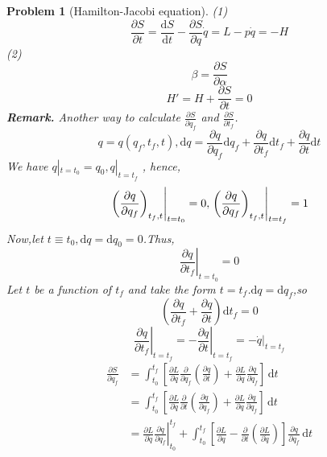 \documentclass{article}
\theoremstyle{t}
\newtheorem{problem}{Problem}
\newcommand{\dd}{\mathrm{d}}
\newcommand{\pa}{\partial}
\begin{document}
\begin{problem}[Hamilton-Jacobi equation]
    (1) \begin{equation}
        \frac{\pa S}{\pa t}=\frac{\dd S}{\dd t}-\frac{\pa S}{\pa q}\dot{q}=L-p\dot{q}=-H
    \end{equation}
    (2) \begin{equation}
        \beta=\frac{\pa S}{\pa \alpha}
    \end{equation}
    \begin{equation}
        H'=H+\frac{\pa S}{\pa t}=0
    \end{equation}
    \textbf{Remark.} Another way to calculate $\frac{\pa S}{\pa q_f}$ and $\frac{\pa S}{\pa t_f}$.
    \begin{equation}
        q=q(q_f,t_f,t),\dd q=\frac{\pa q}{\pa q_f}\dd q_f+\frac{\pa q}{\pa t_f}\dd t_f+\frac{\pa q}{\pa t}\dd t
    \end{equation}
    We have $q|_{t=t_0}=q_0,q|_{t=t_f}$ , hence,
    \begin{equation}
      \left. \left( \frac{\pa q}{\pa q_f}\right)_{t_f,t}\right|_{t=t_0}=0,\space\left.\left( \frac{\pa q}{\pa q_f}\right)_{t_f,t}\right|_{t=t_f}=1
    \end{equation}
    Now,let $t\equiv t_0,\dd q=\dd q_0=0$.Thus,
    \begin{equation}
        \left.\frac{\pa q}{\pa t_f}\right|_{t=t_0}=0
    \end{equation}
    Let $t$ be a function of $t_f$ and take the form $t=t_f$.$\dd q=\dd q_f$,so 
    \begin{equation}
        \left(\frac{\pa q}{\pa t_f}+\frac{\pa q}{\pa t}\right)\dd t_f=0
    \end{equation}
    \begin{equation}
        \left.\frac{\pa q}{\pa t_f}\right|_{t=t_f}=-\left.\frac{\pa q}{\pa t}\right|_{t=t_f}=\left.-\dot{q}\right|_{t=t_f}
    \end{equation}
\begin{equation}
\begin{split}
    \frac{\pa S}{\pa q_f}&=\int_{t_0}^{t_f}\left[\frac{\pa L}{\pa \dot{q}}\frac{\pa}{\pa q_f}\left(\frac{\pa q}{\pa t}\right)+\frac{\pa L}{\pa q}\frac{\pa q}{\pa q_f}\right]\,\dd t\\
    &=\int_{t_0}^{t_f}\left[\frac{\pa L}{\pa \dot{q}}\frac{\pa}{\pa t}\left(\frac{\pa q}{\pa q_f}\right)+\frac{\pa L}{\pa q}\frac{\pa q}{\pa q_f}\right]\,\dd t\\
    &=\left.\frac{\pa L}{\pa \dot{q}}\frac{\pa q}{\pa q_f}\right|_{t_0}^{t_f}+\int_{t_0}^{t_f}\left[\frac{\pa L}{\pa q}-\frac{\pa}{\pa t}\left(\frac{\pa L}{\pa \dot{q}}\right)\right]\frac{\pa q}{\pa q_f}\,\dd t\\

\end{split}
\end{equation}
\end{problem}
\end{document}
